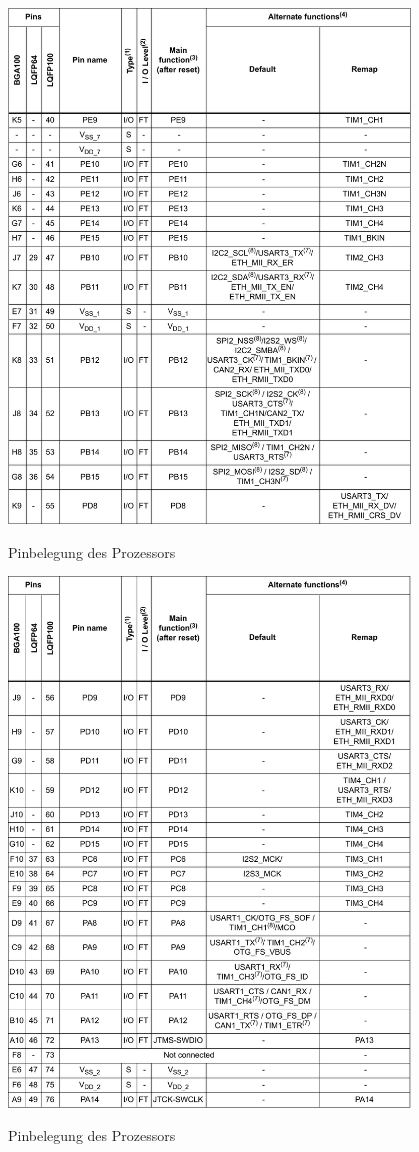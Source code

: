 \begin{table}[htb]\ContinuedFloat
    \centering
    \includegraphics[width=0.8\textwidth]{Schuh/Pictures/Pinbelegung3}
    \caption[Pinbelegung des Prozessors]{Pinbelegung des Prozessors \cite{stm:stm32f107rc}}
\end{table}
\begin{table}[htb]\ContinuedFloat
    \centering
    \includegraphics[width=0.8\textwidth]{Schuh/Pictures/Pinbelegung4}
    \caption[Pinbelegung des Prozessors]{Pinbelegung des Prozessors \cite{stm:stm32f107rc}}
\end{table}
